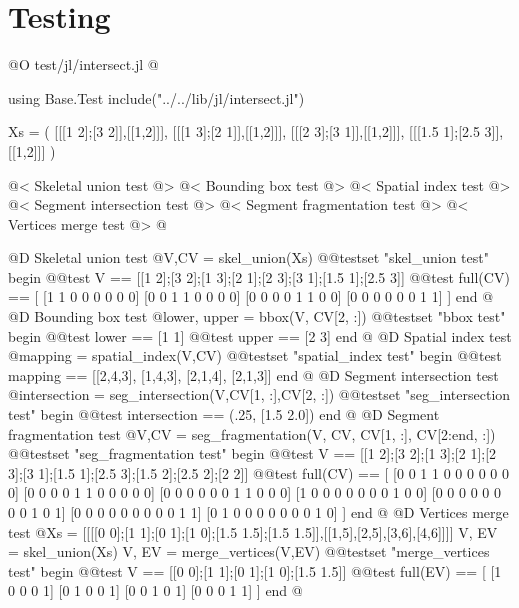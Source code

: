 \documentclass[10pt,oneside]{article}
\begin{document}
\section{Testing}
@O test/jl/intersect.jl
@{using Base.Test
include("../../lib/jl/intersect.jl")

Xs = (
    [[[1 2];[3 2]],[[1,2]]],
    [[[1 3];[2 1]],[[1,2]]],
    [[[2 3];[3 1]],[[1,2]]],
    [[[1.5 1];[2.5 3]],[[1,2]]]
)

@< Skeletal union test @>
@< Bounding box test @>
@< Spatial index test @>
@< Segment intersection test @>
@< Segment fragmentation test @>
@< Vertices merge test @>
@}
@D Skeletal union test
@{V,CV = skel_union(Xs)
@@testset "skel_union test" begin
    @@test V == [[1 2];[3 2];[1 3];[2 1];[2 3];[3 1];[1.5 1];[2.5 3]]
    @@test full(CV) == [
        [1 1 0 0 0 0 0 0]
        [0 0 1 1 0 0 0 0]
        [0 0 0 0 1 1 0 0]
        [0 0 0 0 0 0 1 1]
    ]
end
@}
@D Bounding box test
@{lower, upper = bbox(V, CV[2, :])
@@testset "bbox test" begin
    @@test lower == [1 1]
    @@test upper == [2 3]
end
@}
@D Spatial index test
@{mapping = spatial_index(V,CV)
@@testset "spatial_index test" begin
    @@test mapping == [[2,4,3], [1,4,3], [2,1,4], [2,1,3]]
end
@}
@D Segment intersection test
@{intersection = seg_intersection(V,CV[1, :],CV[2, :])
@@testset "seg_intersection test" begin
    @@test intersection == (.25, [1.5 2.0])
end
@}
@D Segment fragmentation test
@{V,CV = seg_fragmentation(V, CV, CV[1, :], CV[2:end, :])
@@testset "seg_fragmentation test" begin
    @@test V == [[1 2];[3 2];[1 3];[2 1];[2 3];[3 1];[1.5 1];[2.5 3];[1.5 2];[2.5 2];[2 2]]
    @@test full(CV) == [
        [0 0 1 1 0 0 0 0 0 0 0]
        [0 0 0 0 1 1 0 0 0 0 0]
        [0 0 0 0 0 0 1 1 0 0 0]
        [1 0 0 0 0 0 0 0 1 0 0]
        [0 0 0 0 0 0 0 0 1 0 1]
        [0 0 0 0 0 0 0 0 0 1 1]
        [0 1 0 0 0 0 0 0 0 1 0]
    ]
end
@}
@D Vertices merge test
@{Xs = [[[[0 0];[1 1];[0 1];[1 0];[1.5 1.5];[1.5 1.5]],[[1,5],[2,5],[3,6],[4,6]]]]
V, EV = skel_union(Xs)
V, EV = merge_vertices(V,EV)
@@testset "merge_vertices test" begin
    @@test V == [[0 0];[1 1];[0 1];[1 0];[1.5 1.5]]
    @@test full(EV) == [
        [1 0 0 0 1]
        [0 1 0 0 1]
        [0 0 1 0 1]
        [0 0 0 1 1]
    ]
end
@}
\end{document}
